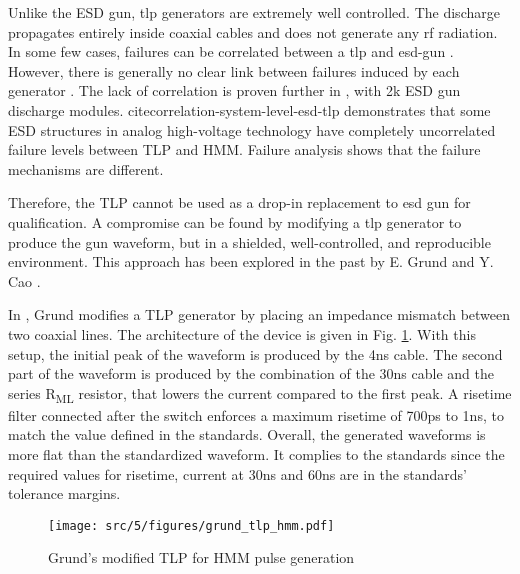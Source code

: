 Unlike the ESD gun, \gls{tlp} generators are extremely well controlled.
The discharge propagates entirely inside coaxial cables and does not generate any \gls{rf} radiation.
In some few cases, failures can be correlated between a \gls{tlp} and \gls{esd-gun} \cite{correlation-system-level-esd-tlp}.
However, there is generally no clear link between failures induced by each generator \cite{miscorrelation-esd-hmm}.
The lack of correlation is proven further in \cite{correlation-system-level-esd-tlp}, with 2k\textOmega{} ESD gun discharge modules.
cite{correlation-system-level-esd-tlp} demonstrates that some ESD structures in analog high-voltage technology have completely uncorrelated failure levels between TLP and HMM. Failure analysis shows that the failure mechanisms are different.

Therefore, the \gls{TLP} cannot be used as a drop-in replacement to \gls{esd} gun for qualification.
A compromise can be found by modifying a \gls{tlp} generator to produce the gun waveform, but in a shielded, well-controlled, and reproducible environment.
This approach has been explored in the past by E. Grund \cite{iec61000-tlp} and Y. Cao \cite{tlp-based-hmm}.

In \cite{iec61000-tlp}, Grund modifies a TLP generator by placing an impedance mismatch between two coaxial lines.
The architecture of the device is given in Fig. \ref{fig:grund_tlp_hmm}.
With this setup, the initial peak of the waveform is produced by the 4ns cable.
The second part of the waveform is produced by the combination of the 30ns cable and the series R\textsubscript{ML} resistor, that lowers the current compared to the first peak.
A risetime filter connected after the switch enforces a maximum risetime of 700ps to 1ns, to match the value defined in the standards.
Overall, the generated waveforms is more flat than the standardized waveform.
It complies to the standards since the required values for risetime, current at 30ns and 60ns are in the standards' tolerance margins.

\begin{figure}[!h]
  \centering
  \texttt{[image: src/5/figures/grund\_tlp\_hmm.pdf]}
  \caption{Grund's modified TLP for HMM pulse generation}
  \label{fig:grund_tlp_hmm}
\end{figure}

